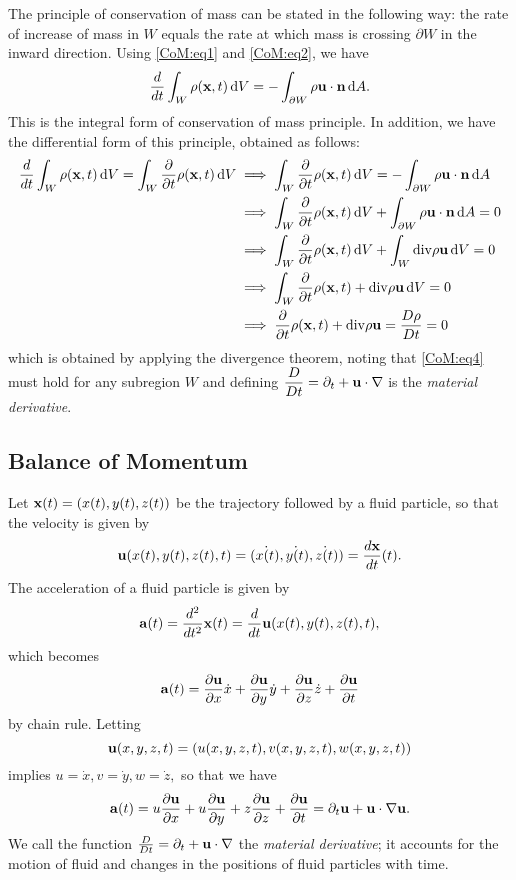 \documentclass[10pt,a4paper,final]{article}
\begin{document}
The principle of conservation of mass can be stated in the following way: the rate of increase of mass in $W$ equals the rate at which mass is crossing $\partial W$ in the inward direction. Using \eqref{CoM:eq1} and \eqref{CoM:eq2}, we have 
\begin{equation}\label{CoM:eq3}
\frac{d}{dt} \int_W \rho(\textbf{x}, t) \,\mathrm{d} V = - \int_{\partial W} \rho \textbf{u} \cdot \textbf{n} \,\mathrm{d} A.
\end{equation}
This is the integral form of conservation of mass principle. 
In addition, we have the differential form of this principle, obtained as follows:
\begin{align}
\frac{d}{dt} \int_W \rho({\bf x}, t) \,\mathrm{d} V = \int_W \frac{\partial}{\partial t} \rho({\bf x}, t) \,\mathrm{d} V &\implies  \int_W \frac{\partial}{\partial t} \rho({\bf x}, t) \,\mathrm{d} V  = - \int_{\partial W} \rho {\bf u} \cdot {\bf n} \,\mathrm{d} A \nonumber \\
&\implies \int_W \frac{\partial}{\partial t} \rho({\bf x}, t) \,\mathrm{d} V  + \int_{\partial W} \rho {\bf u} \cdot {\bf n} \,\mathrm{d} A = 0 \nonumber \\
&\implies \int_W \frac{\partial}{\partial t} \rho({\bf x}, t) \,\mathrm{d} V + \int_W {\rm div} \rho {\bf u} \,\mathrm{d} V = 0 \nonumber \\
&\implies \int_W \frac{\partial}{\partial t} \rho({\bf x}, t) +  {\rm div} \rho {\bf u} \,\mathrm{d} V = 0 \label{CoM:eq4} \\
&\implies \frac{\partial}{\partial t} \rho({\bf x}, t) +  {\rm div} \rho {\bf u} = \frac{D\rho}{Dt} = 0
\end{align} 
which is obtained by applying the divergence theorem, noting that \eqref{CoM:eq4} must hold for any subregion $W$ and defining $\displaystyle\frac{D}{Dt} = \partial_t + {\bf u}\cdot \nabla$ is the \emph{material derivative}.

\subsection{Balance of Momentum}
Let ${\bf x}(t) = (x(t), y(t), z(t))$ be the trajectory followed by a fluid particle, so that the velocity is given by 
\[ 
{\bf u}(x(t), y(t), z(t), t) = (x\dot(t), y\dot(t), z\dot(t)) = \frac{d {\bf x} }{d t}(t).
\]
The acceleration of a fluid particle is given by 
\[ {\bf a}(t) = \frac{d^2}{dt^2}{\bf x}(t) = \frac{d}{dt} {\bf u}(x(t), y(t), z(t), t),\]
which becomes 
\[ 
{\bf a}(t) = \frac{\partial {\bf u}}{\partial x}\dot{x} + \frac{\partial {\bf u}}{\partial y}\dot{y} + \frac{\partial {\bf u}}{\partial z}\dot{z} + \frac{\partial {\bf u}}{\partial t}
\]
by chain rule. Letting
\[ 
{\bf u}(x,y,z,t) = (u(x,y,z,t), v(x,y,z,t), w(x,y,z,t))
\]
implies $u = \dot{x}, v = \dot{y}, w = \dot{z},$ so that we have 
\[ 
{\bf a}(t) = u\frac{\partial {\bf u}}{\partial x} + u\frac{\partial {\bf u}}{\partial y}+ z\frac{\partial {\bf u}}{\partial z} + \frac{\partial {\bf u}}{\partial t} = \partial_t {\bf u} + {\bf u} \cdot \nabla {\bf u}.
\]
We call the function $\frac{D}{Dt} = \partial_t + {\bf u} \cdot \nabla$ the \emph{material derivative}; it accounts for the motion of fluid and changes in the positions of fluid particles with time.
\end{document}
